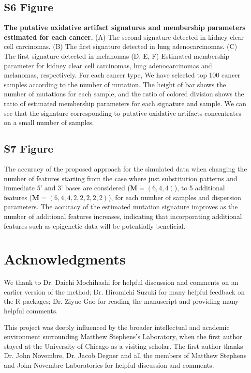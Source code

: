 \documentclass[10pt,letterpaper]{article}
\begin{document}
\subsection*{S6 Figure}
\label{oxidation}
{\bf The putative oxidative artifact signatures and membership parameters estimated for each cancer.}
(A) The second signature detected in kidney clear cell carcinomas.
(B) The first signature detected in lung adenocarcinomas.
(C) The first signature detected in melanomas
(D, E, F) Estimated membership parameter for kidney clear cell carcinomas, lung adenocarcinomas and melanomas, respectively.
For each cancer type, 
We have selected top 100 cancer samples according to the number of mutation.
The height of bar shows the number of mutations for each sample,
and the ratio of colored division shows the ratio of estimated membership parameters for each signature and sample.
We can see that the signature corresponding to putative oxidative artifacts concentrates on a small number of samples.

\subsection*{S7 Figure}
\label{simu_epi}
The accuracy of the proposed approach for the simulated data when changing the number of features starting 
from the case where just substitution patterns and immediate 5' and 3' bases are considered ($\bm{M} = (6, 4, 4)$), to 5 additional features ($\bm{M} = (6, 4, 4, 2, 2, 2, 2, 2)$),
for each number of samples and dispersion parameters.  
The accuracy of the estimated mutation signature improves as the number of additional features increases, 
indicating that incorporating additional features such as epigenetic data will be potentially beneficial.


\section*{Acknowledgments}

We thank to Dr. Daichi Mochihashi for helpful discussion and comments on an earlier version of the method;
Dr. Hiromichi Suzuki for many helpful feedback on the R packages;
Dr. Ziyue Gao for reading the manuscript and providing many helpful comments.

This project was deeply influenced by the broader intellectual and academic environment surrounding Matthew Stephens's Laboratory,
when the first author stayed at the University of Chicago as a visiting scholar. The first author thanks Dr. John Novembre,
Dr. Jacob Degner and all the members of Matthew Stephens and John Novembre Laboratories for helpful discussion and comments.
\end{document}
